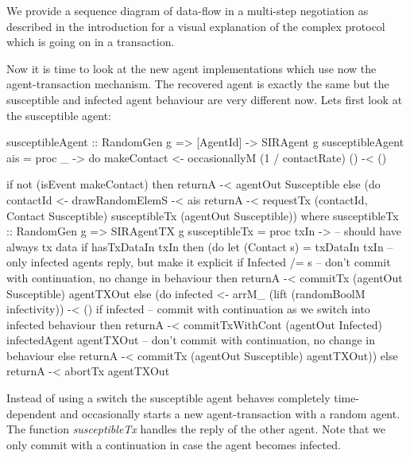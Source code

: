 We provide a sequence diagram of data-flow in a multi-step negotiation as described in the introduction for a visual explanation of the complex protocol which is going on in a transaction.

Now it is time to look at the new agent implementations which use now the agent-transaction mechanism. The recovered agent is exactly the same but the susceptible and infected agent behaviour are very different now. Lets first look at the susceptible agent:

\begin{HaskellCode}
susceptibleAgent :: RandomGen g => [AgentId] -> SIRAgent g
susceptibleAgent ais = proc _ -> do
    makeContact <- occasionallyM (1 / contactRate) () -< ()

    if not (isEvent makeContact)
      then returnA -< agentOut Susceptible
      else (do
        contactId <- drawRandomElemS -< ais
        returnA -< requestTx 
                    (contactId, Contact Susceptible) 
                    susceptibleTx
                    (agentOut Susceptible))
  where
    susceptibleTx :: RandomGen g => SIRAgentTX g
    susceptibleTx = proc txIn ->
      -- should have always tx data
      if hasTxDataIn txIn 
          then (do
            let (Contact s) = txDataIn txIn 
            -- only infected agents reply, but make it explicit
            if Infected /= s
              -- don't commit with continuation, no change in behaviour
              then returnA -< commitTx (agentOut Susceptible) agentTXOut
              else (do
                infected <- arrM_ (lift (randomBoolM infectivity)) -< ()
                if infected
                  -- commit with continuation as we switch into infected behaviour
                  then returnA -< commitTxWithCont 
                                    (agentOut Infected) 
                                    infectedAgent
                                    agentTXOut
                  -- don't commit with continuation, no change in behaviour
                  else returnA -< commitTx (agentOut Susceptible) agentTXOut))
          else returnA -< abortTx agentTXOut
\end{HaskellCode}

Instead of using a switch the susceptible agent behaves completely time-dependent and occasionally starts a new agent-transaction with a random agent. The function \textit{susceptibleTx} handles the reply of the other agent. Note that we only commit with a continuation in case the agent becomes infected.

